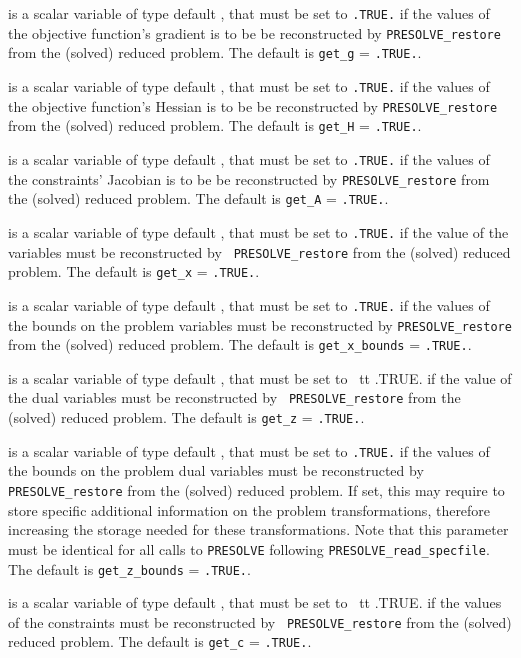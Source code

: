 \documentclass{galahad}
\newcommand{\packagename}{PRESOLVE}
\begin{document}
\begin{description}
 is a scalar variable of type default \logical, that
must be set to {\tt .TRUE.} if the values of the objective
function's gradient is to be be reconstructed
by {\tt \packagename\_restore} from the (solved) reduced problem.
The default is {\tt get\_g} = {\tt .TRUE.}.

 is a scalar variable of type default \logical, that
must be set to {\tt .TRUE.} if the values of the objective
function's Hessian is to be be reconstructed
by {\tt \packagename\_restore} from the (solved) reduced problem.
The default is {\tt get\_H} = {\tt .TRUE.}.

 is a scalar variable of type default \logical, that
must be set to {\tt .TRUE.} if the values of the constraints'
Jacobian is to be be reconstructed
by {\tt \packagename\_restore} from the (solved) reduced problem.
The default is {\tt get\_A} = {\tt .TRUE.}.

 is a scalar variable of type default \logical, that
must be set to {\tt .TRUE.} if the value of the variables
must be reconstructed by {\tt
\packagename\_restore} from the (solved) reduced problem.
The default is {\tt get\_x} = {\tt .TRUE.}.

 is a scalar variable of type default \logical, that
must be set to {\tt .TRUE.} if the values of the bounds on the
problem variables must be reconstructed by {\tt \packagename\_restore}
from the (solved) reduced problem.
The default is {\tt get\_x\_bounds} = {\tt .TRUE.}.

 is a scalar variable of type default \logical, that
must be set to {\ tt .TRUE.} if the value of the dual variables
must be reconstructed by {\tt
\packagename\_restore} from the (solved) reduced problem.
The default is {\tt get\_z} = {\tt .TRUE.}.

 is a scalar variable of type default \logical, that
must be set to {\tt .TRUE.} if the values of the bounds on the
problem dual variables must be reconstructed by {\tt \packagename\_restore}
from the (solved) reduced problem.
If set, this may require to store specific
additional information on the problem transformations, 
therefore increasing the storage needed for these transformations. 
Note that this parameter must be identical for all calls to 
{\tt \packagename} following {\tt \packagename\_read\_specfile}. 
The default is {\tt get\_z\_bounds} = {\tt .TRUE.}.

 is a scalar variable of type default \logical, that
must be set to {\ tt .TRUE.} if the values of the constraints
must be reconstructed by {\tt
\packagename\_restore} from the (solved) reduced problem.
The default is {\tt get\_c} = {\tt .TRUE.}.


\end{description}
\end{document}
